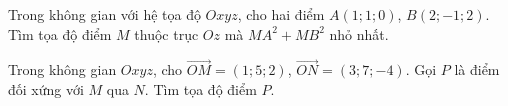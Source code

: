 \begin{bt} %
	Trong không gian với hệ tọa độ $ Oxyz$, cho hai điểm $A(1;1;0)$, $B(2;-1;2)$. Tìm tọa độ điểm $M$ thuộc trục $Oz$ mà $MA^2+MB^2$ nhỏ nhất.
	
\end{bt}
\begin{bt} %
	Trong không gian $Oxyz$, cho $\overrightarrow{OM}=\left(1;5;2\right)$, $\overrightarrow{ON}=\left(3;7;-4\right)$. Gọi $P$ là điểm đối xứng với $M$ qua $N$. Tìm tọa độ điểm $P$.
	
\end{bt}

